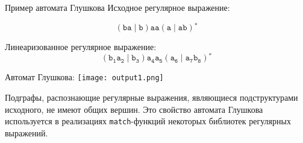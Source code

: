\documentclass[mathserif]{beamer}
\def\alter{\ensuremath{\mathrel{\vert}}}%
\def\star{\ensuremath{^{*}}}%
\def\regexpstr#1{\mathtt{#1}}%
\begin{document}
\begin{frame}{Пример автомата Глушкова}
    Исходное регулярное выражение:

    \[(\regexpstr{ba}\alter \regexpstr{b})\regexpstr{aa}(\regexpstr{a}\alter\regexpstr{ab})\star\]%

    Линеаризованное регулярное выражение:
    \[(\regexpstr{b_{1}a_{2}}\alter \regexpstr{b_{3}})\regexpstr{a_{4}a_{5}}(\regexpstr{a_{6}}\alter\regexpstr{a_{7}b_{8}})\star\] %

    Автомат Глушкова:
    \texttt{[image: output1.png]}

    Подграфы, распознающие регулярные выражения, являющиеся подструктурами исходного, не имеют общих вершин. Это свойство автомата Глушкова используется в реализациях \texttt{match}-функций некоторых библиотек регулярных выражений. %
\end{frame}

\end{document}
